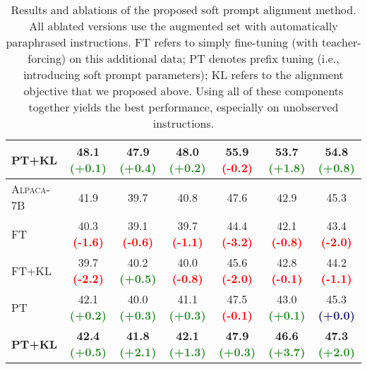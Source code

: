 \begin{table}[h]
\begin{tabular}{l c c c c c c }
    \textbf{PT+KL}      & \textbf{48.1} \textcolor{ForestGreen}{\textbf{(+0.1)}} & \textbf{47.9} \textcolor{ForestGreen}{\textbf{(+0.4)}} & \textbf{48.0} \textcolor{ForestGreen}{\textbf{(+0.2)}} & 55.9 \textcolor{red}{\textbf{(-0.2)}}                  & \textbf{53.7} \textcolor{ForestGreen}{\textbf{(+1.8)}} & \textbf{54.8} \textcolor{ForestGreen}{\textbf{(+0.8)}} \\
    \midrule
    \textsc{Alpaca-7B}  & 41.9                                                   & 39.7                                                   & 40.8                                                   & 47.6                                                   & 42.9                                                   & 45.3                                                   \\
    FT                  & 40.3 \textcolor{red}{\textbf{(-1.6)}}                  & 39.1 \textcolor{red}{\textbf{(-0.6)}}                  & 39.7 \textcolor{red}{\textbf{(-1.1)}}                  & 44.4 \textcolor{red}{\textbf{(-3.2)}}                  & 42.1 \textcolor{red}{\textbf{(-0.8)}}                  & 43.4 \textcolor{red}{\textbf{(-2.0)}}                  \\
    FT+KL               & 39.7 \textcolor{red}{\textbf{(-2.2)}}                  & 40.2 \textcolor{ForestGreen}{\textbf{(+0.5)}}          & 40.0 \textcolor{red}{\textbf{(-0.8)}}                  & 45.6 \textcolor{red}{\textbf{(-2.0)}}                  & 42.8 \textcolor{red}{\textbf{(-0.1)}}                  & 44.2 \textcolor{red}{\textbf{(-1.1)}}                  \\
    PT                  & 42.1 \textcolor{ForestGreen}{\textbf{(+0.2)}}          & 40.0 \textcolor{ForestGreen}{\textbf{(+0.3)}}          & 41.1 \textcolor{ForestGreen}{\textbf{(+0.3)}}          & 47.5 \textcolor{red}{\textbf{(-0.1)}}                  & 43.0 \textcolor{ForestGreen}{\textbf{(+0.1)}}          & 45.3 \textcolor{MidnightBlue}{\textbf{(+0.0)}}         \\
    \textbf{PT+KL}      & \textbf{42.4} \textcolor{ForestGreen}{\textbf{(+0.5)}} & \textbf{41.8} \textcolor{ForestGreen}{\textbf{(+2.1)}} & \textbf{42.1} \textcolor{ForestGreen}{\textbf{(+1.3)}} & \textbf{47.9} \textcolor{ForestGreen}{\textbf{(+0.3)}} & \textbf{46.6} \textcolor{ForestGreen}{\textbf{(+3.7)}} & \textbf{47.3} \textcolor{ForestGreen}{\textbf{(+2.0)}} \\
    \bottomrule
  \end{tabular}
  \caption{Results and ablations of the proposed soft prompt alignment method. All ablated versions use the augmented set with automatically paraphrased instructions. FT refers to simply fine-tuning (with teacher-forcing) on this additional data; PT denotes prefix tuning (i.e., introducing soft prompt parameters); KL refers to the alignment objective that we proposed above. Using all of these components together yields the best performance, especially on unobserved instructions.}
  \label{tab:alignment-results}
\end{table}

